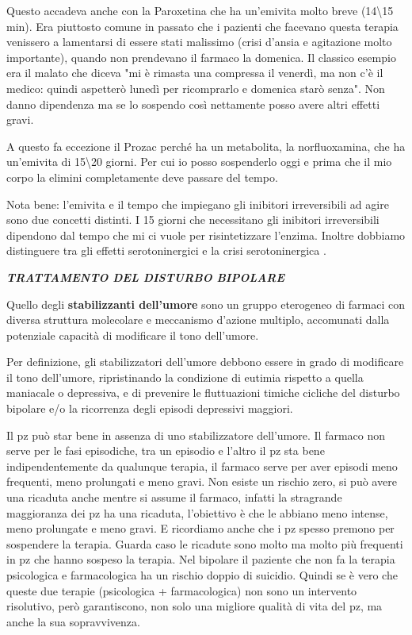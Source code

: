 \documentclass[]{article}
\begin{document}
Questo accadeva anche con la Paroxetina che ha un'emivita molto breve
(14\textbackslash{}15 min). Era piuttosto comune in passato che i
pazienti che facevano questa terapia venissero a lamentarsi di essere
stati malissimo (crisi d'ansia e agitazione molto importante), quando
non prendevano il farmaco la domenica. Il classico esempio era il malato
che diceva "mi è rimasta una compressa il venerdì, ma non c'è il medico:
quindi aspetterò lunedì per ricomprarlo e domenica starò senza". Non
danno dipendenza ma se lo sospendo così nettamente posso avere altri
effetti gravi.

A questo fa eccezione il Prozac perché ha un metabolita, la
norfluoxamina, che ha un'emivita di 15\textbackslash{}20 giorni. Per cui
io posso sospenderlo oggi e prima che il mio corpo la elimini
completamente deve passare del tempo.

Nota bene: l'emivita e il tempo che impiegano gli inibitori
irreversibili ad agire sono due concetti distinti. I 15 giorni che
necessitano gli inibitori irreversibili dipendono dal tempo che mi ci
vuole per risintetizzare l'enzima. Inoltre dobbiamo distinguere tra gli
effetti serotoninergici e la crisi serotoninergica .

\textbf{\emph{TRATTAMENTO DEL DISTURBO BIPOLARE}}

Quello degli \textbf{stabilizzanti dell'umore} sono un gruppo eterogeneo
di farmaci con diversa struttura molecolare e meccanismo d'azione
multiplo, accomunati dalla potenziale capacità di modificare il tono
dell'umore.

Per definizione, gli stabilizzatori dell'umore debbono essere in grado
di modificare il tono dell'umore, ripristinando la condizione di eutimia
rispetto a quella maniacale o depressiva, e di prevenire le fluttuazioni
timiche cicliche del disturbo bipolare e/o la ricorrenza degli episodi
depressivi maggiori.

Il pz può star bene in assenza di uno stabilizzatore dell'umore. Il
farmaco non serve per le fasi episodiche, tra un episodio e l'altro il
pz sta bene indipendentemente da qualunque terapia, il farmaco serve per
aver episodi meno frequenti, meno prolungati e meno gravi. Non esiste un
rischio zero, si può avere una ricaduta anche mentre si assume il
farmaco, infatti la stragrande maggioranza dei pz ha una ricaduta,
l'obiettivo è che le abbiano meno intense, meno prolungate e meno gravi.
E ricordiamo anche che i pz spesso premono per sospendere la terapia.
Guarda caso le ricadute sono molto ma molto più frequenti in pz che
hanno sospeso la terapia. Nel bipolare il paziente che non fa la terapia
psicologica e farmacologica ha un rischio doppio di suicidio. Quindi se
è vero che queste due terapie (psicologica + farmacologica) non sono un
intervento risolutivo, però garantiscono, non solo una migliore qualità
di vita del pz, ma anche la sua sopravvivenza.
\end{document}
